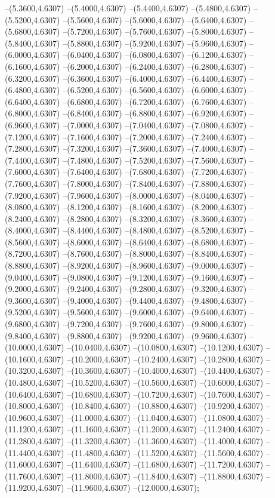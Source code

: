 {	--(5.3600,4.6307)
	--(5.4000,4.6307)
	--(5.4400,4.6307)
	--(5.4800,4.6307)
	--(5.5200,4.6307)
	--(5.5600,4.6307)
	--(5.6000,4.6307)
	--(5.6400,4.6307)
	--(5.6800,4.6307)
	--(5.7200,4.6307)
	--(5.7600,4.6307)
	--(5.8000,4.6307)
	--(5.8400,4.6307)
	--(5.8800,4.6307)
	--(5.9200,4.6307)
	--(5.9600,4.6307)
	--(6.0000,4.6307)
	--(6.0400,4.6307)
	--(6.0800,4.6307)
	--(6.1200,4.6307)
	--(6.1600,4.6307)
	--(6.2000,4.6307)
	--(6.2400,4.6307)
	--(6.2800,4.6307)
	--(6.3200,4.6307)
	--(6.3600,4.6307)
	--(6.4000,4.6307)
	--(6.4400,4.6307)
	--(6.4800,4.6307)
	--(6.5200,4.6307)
	--(6.5600,4.6307)
	--(6.6000,4.6307)
	--(6.6400,4.6307)
	--(6.6800,4.6307)
	--(6.7200,4.6307)
	--(6.7600,4.6307)
	--(6.8000,4.6307)
	--(6.8400,4.6307)
	--(6.8800,4.6307)
	--(6.9200,4.6307)
	--(6.9600,4.6307)
	--(7.0000,4.6307)
	--(7.0400,4.6307)
	--(7.0800,4.6307)
	--(7.1200,4.6307)
	--(7.1600,4.6307)
	--(7.2000,4.6307)
	--(7.2400,4.6307)
	--(7.2800,4.6307)
	--(7.3200,4.6307)
	--(7.3600,4.6307)
	--(7.4000,4.6307)
	--(7.4400,4.6307)
	--(7.4800,4.6307)
	--(7.5200,4.6307)
	--(7.5600,4.6307)
	--(7.6000,4.6307)
	--(7.6400,4.6307)
	--(7.6800,4.6307)
	--(7.7200,4.6307)
	--(7.7600,4.6307)
	--(7.8000,4.6307)
	--(7.8400,4.6307)
	--(7.8800,4.6307)
	--(7.9200,4.6307)
	--(7.9600,4.6307)
	--(8.0000,4.6307)
	--(8.0400,4.6307)
	--(8.0800,4.6307)
	--(8.1200,4.6307)
	--(8.1600,4.6307)
	--(8.2000,4.6307)
	--(8.2400,4.6307)
	--(8.2800,4.6307)
	--(8.3200,4.6307)
	--(8.3600,4.6307)
	--(8.4000,4.6307)
	--(8.4400,4.6307)
	--(8.4800,4.6307)
	--(8.5200,4.6307)
	--(8.5600,4.6307)
	--(8.6000,4.6307)
	--(8.6400,4.6307)
	--(8.6800,4.6307)
	--(8.7200,4.6307)
	--(8.7600,4.6307)
	--(8.8000,4.6307)
	--(8.8400,4.6307)
	--(8.8800,4.6307)
	--(8.9200,4.6307)
	--(8.9600,4.6307)
	--(9.0000,4.6307)
	--(9.0400,4.6307)
	--(9.0800,4.6307)
	--(9.1200,4.6307)
	--(9.1600,4.6307)
	--(9.2000,4.6307)
	--(9.2400,4.6307)
	--(9.2800,4.6307)
	--(9.3200,4.6307)
	--(9.3600,4.6307)
	--(9.4000,4.6307)
	--(9.4400,4.6307)
	--(9.4800,4.6307)
	--(9.5200,4.6307)
	--(9.5600,4.6307)
	--(9.6000,4.6307)
	--(9.6400,4.6307)
	--(9.6800,4.6307)
	--(9.7200,4.6307)
	--(9.7600,4.6307)
	--(9.8000,4.6307)
	--(9.8400,4.6307)
	--(9.8800,4.6307)
	--(9.9200,4.6307)
	--(9.9600,4.6307)
	--(10.0000,4.6307)
	--(10.0400,4.6307)
	--(10.0800,4.6307)
	--(10.1200,4.6307)
	--(10.1600,4.6307)
	--(10.2000,4.6307)
	--(10.2400,4.6307)
	--(10.2800,4.6307)
	--(10.3200,4.6307)
	--(10.3600,4.6307)
	--(10.4000,4.6307)
	--(10.4400,4.6307)
	--(10.4800,4.6307)
	--(10.5200,4.6307)
	--(10.5600,4.6307)
	--(10.6000,4.6307)
	--(10.6400,4.6307)
	--(10.6800,4.6307)
	--(10.7200,4.6307)
	--(10.7600,4.6307)
	--(10.8000,4.6307)
	--(10.8400,4.6307)
	--(10.8800,4.6307)
	--(10.9200,4.6307)
	--(10.9600,4.6307)
	--(11.0000,4.6307)
	--(11.0400,4.6307)
	--(11.0800,4.6307)
	--(11.1200,4.6307)
	--(11.1600,4.6307)
	--(11.2000,4.6307)
	--(11.2400,4.6307)
	--(11.2800,4.6307)
	--(11.3200,4.6307)
	--(11.3600,4.6307)
	--(11.4000,4.6307)
	--(11.4400,4.6307)
	--(11.4800,4.6307)
	--(11.5200,4.6307)
	--(11.5600,4.6307)
	--(11.6000,4.6307)
	--(11.6400,4.6307)
	--(11.6800,4.6307)
	--(11.7200,4.6307)
	--(11.7600,4.6307)
	--(11.8000,4.6307)
	--(11.8400,4.6307)
	--(11.8800,4.6307)
	--(11.9200,4.6307)
	--(11.9600,4.6307)
	--(12.0000,4.6307);
}

